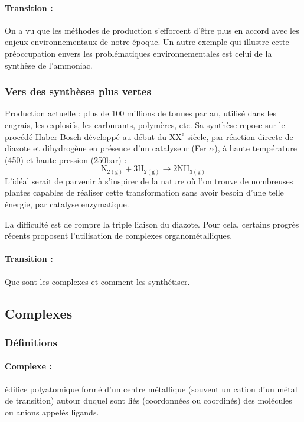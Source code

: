 \paragraph{Transition : } On a vu que les méthodes de production s'efforcent d'être plus en accord avec les enjeux environnementaux de notre époque.
Un autre exemple qui illustre cette préoccupation envers les problématiques environnementales est celui de la synthèse de l'ammoniac.

\subsubsection{Vers des synthèses plus vertes}

Production actuelle : plus de 100 millions de tonnes par an, utilisé dans les engrais, les explosifs, les carburants, polymères, etc.
Sa synthèse repose sur le procédé Haber-Bosch développé au début du $\mathrm{XX^e}$ siècle, par réaction directe de diazote et dihydrogène en présence d'un catalyseur (Fer $\alpha$), à haute température (\unit{450}{\celsius}) et haute pression (\unit{250}{bar}) :
\begin{equation*}
\mathrm{N_{2(g)}} + 3\mathrm{H_{2(g)}} \rightarrow 2\mathrm{NH_{3(g)}}
\end{equation*}
L'idéal serait de parvenir à s'inspirer de la nature où l'on trouve de nombreuses plantes capables de réaliser cette transformation sans avoir besoin d'une telle énergie, par catalyse enzymatique.

La difficulté est de rompre la triple liaison du diazote. 
Pour cela, certains progrès récents proposent l'utilisation de complexes organométalliques.

\paragraph{Transition : } Que sont les complexes et comment les synthétiser.

\subsection{Complexes}

\subsubsection{Définitions}

\paragraph{Complexe : } édifice polyatomique formé d'un centre métallique (souvent un cation d'un métal de transition) autour duquel sont liés (coordonnées ou coordinés) des molécules ou anions appelés ligands.

